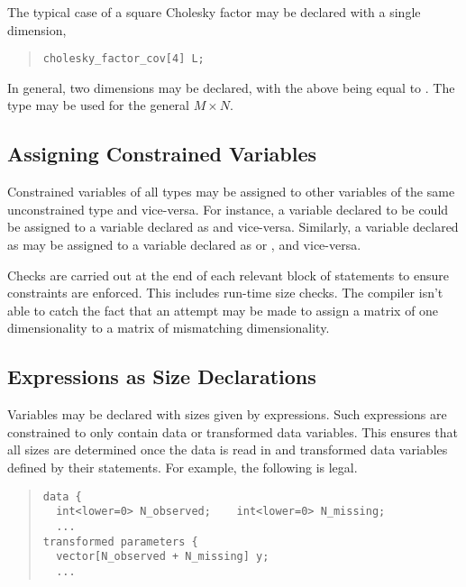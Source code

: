 The typical case of a square Cholesky factor may be declared with a
single dimension,
%
\begin{quote}
\begin{Verbatim}
cholesky_factor_cov[4] L;
\end{Verbatim}
\end{quote}
%
In general, two dimensions may be declared, with the above being equal to 
.  The
type  may be used for the general 
$M \times N$.

\subsection{Assigning Constrained Variables}

Constrained variables of all types may be assigned to other variables
of the same unconstrained type and vice-versa.  For instance, a
variable declared to be  could be assigned
to a variable declared as  and vice-versa.  Similarly, a
variable declared as  may be assigned to a variable
declared as  or
, and vice-versa.

Checks are carried out at the end of each relevant block of statements
to ensure constraints are enforced.  This includes run-time size
checks.  The \Stan compiler isn't able to catch the fact that an
attempt may be made to assign a matrix of one dimensionality to a
matrix of mismatching dimensionality.  


\subsection{Expressions as Size Declarations}

Variables may be declared with sizes given by expressions.  Such
expressions are constrained to only contain data or transformed data
variables.  This ensures that all sizes are determined once the data
is read in and transformed data variables defined by their statements.
For example, the following is legal.
%
\begin{quote}
\begin{Verbatim}[fontsize=\small]
data {
  int<lower=0> N_observed;    int<lower=0> N_missing;
  ...
transformed parameters {
  vector[N_observed + N_missing] y;
  ...
\end{Verbatim}
\end{quote}

